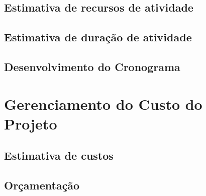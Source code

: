     \section{Estimativa de recursos de atividade}



    \section{Estimativa de duração de atividade}



    \section{Desenvolvimento do Cronograma}



\chapter{Gerenciamento do Custo do Projeto}



    \section{Estimativa de custos}



    \section{Orçamentação}



